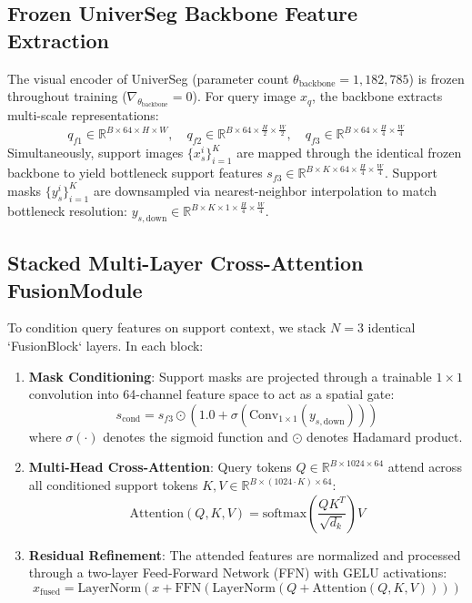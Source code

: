 \documentclass[runningheads]{llncs}
\begin{document}
\subsection{Frozen UniverSeg Backbone Feature Extraction}
The visual encoder of UniverSeg (parameter count $\theta_{\text{backbone}} = 1,182,785$) is frozen throughout training ($\nabla_{\theta_{\text{backbone}}} = 0$). For query image $x_q$, the backbone extracts multi-scale representations:
\begin{equation}
    q_{f1} \in \mathbb{R}^{B \times 64 \times H \times W}, \quad q_{f2} \in \mathbb{R}^{B \times 64 \times \frac{H}{2} \times \frac{W}{2}}, \quad q_{f3} \in \mathbb{R}^{B \times 64 \times \frac{H}{4} \times \frac{W}{4}}
\end{equation}
Simultaneously, support images $\{ x_s^i \}_{i=1}^K$ are mapped through the identical frozen backbone to yield bottleneck support features $s_{f3} \in \mathbb{R}^{B \times K \times 64 \times \frac{H}{4} \times \frac{W}{4}}$. Support masks $\{ y_s^i \}_{i=1}^K$ are downsampled via nearest-neighbor interpolation to match bottleneck resolution: $y_{s,\text{down}} \in \mathbb{R}^{B \times K \times 1 \times \frac{H}{4} \times \frac{W}{4}}$.

\subsection{Stacked Multi-Layer Cross-Attention FusionModule}
To condition query features on support context, we stack $N=3$ identical `FusionBlock` layers. In each block:
\begin{enumerate}
    \item \textbf{Mask Conditioning}: Support masks are projected through a trainable $1 \times 1$ convolution into 64-channel feature space to act as a spatial gate:
    \begin{equation}
        s_{\text{cond}} = s_{f3} \odot \left( 1.0 + \sigma(\text{Conv}_{1 \times 1}(y_{s,\text{down}})) \right)
    \end{equation}
    where $\sigma(\cdot)$ denotes the sigmoid function and $\odot$ denotes Hadamard product.
    \item \textbf{Multi-Head Cross-Attention}: Query tokens $Q \in \mathbb{R}^{B \times 1024 \times 64}$ attend across all conditioned support tokens $K, V \in \mathbb{R}^{B \times (1024 \cdot K) \times 64}$:
    \begin{equation}
        \text{Attention}(Q, K, V) = \text{softmax}\left( \frac{Q K^T}{\sqrt{d_k}} \right) V
    \end{equation}
    \item \textbf{Residual Refinement}: The attended features are normalized and processed through a two-layer Feed-Forward Network (FFN) with GELU activations:
    \begin{equation}
        x_{\text{fused}} = \text{LayerNorm}\left( x + \text{FFN}(\text{LayerNorm}(Q + \text{Attention}(Q, K, V))) \right)
    \end{equation}
\end{enumerate}
\end{document}
